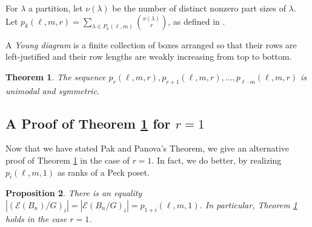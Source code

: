 \documentclass[smallextended, envcountsame, numbook]{svjour3}
\theoremstyle{plain}
\newtheorem{thm}{Theorem}[section]
\newtheorem{prop}[thm]{Proposition}
\theoremstyle{definition}
\theoremstyle{remark}
\numberwithin{equation}{section}
\newcommand\ssec{\subsection}
\begin{document}
For $\lambda$ a partition, let $\nu(\lambda)$ be the number of distinct nonzero part sizes of $\lambda$.  Let $p_k(\ell,m,r) = \sum_{\lambda \in P_k(\ell,m)} \binom{\nu(\lambda)}{r}$, as defined in \cite[Section 1]{pak}.

A {\it Young diagram} is a finite collection of boxes arranged
so that their rows are left-justified and their row lengths are weakly
increasing from top to bottom.

\begin{thm}
\label{thm:pak_thm}
\cite[Theorem 1.1]{pak}
The sequence $p_r(\ell,m,r), p_{r+1}(\ell,m,r),\ldots, p_{\ell\cdot m}(\ell,m,r)$ is unimodal and symmetric.
\end{thm}

\ssec{A Proof of Theorem \ref{thm:pak_thm} for $r = 1$}
Now that we have stated Pak and Panova's Theorem, we give an alternative proof of Theorem \ref{thm:pak_thm} in the case of $r=1$. In fact, we do better, by realizing $p_i(\ell,m,1)$ as ranks of a Peck poset.

\begin{prop}
\label{prop:rank_gen_fn_wreath_1}
There is an equality $|(\mathcal E(B_n)/G)_i| = |\mathcal E(B_n/G)_i| = p_{1+i}(\ell,m,1)$. In particular, Theorem \ref{thm:pak_thm} holds in the case $r = 1$.
\end{prop}
\end{document}
